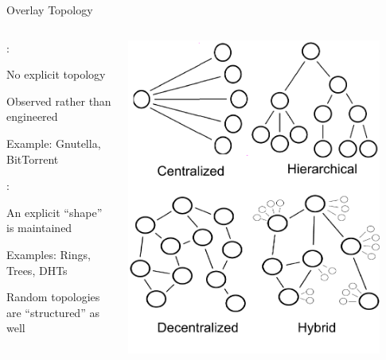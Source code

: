 
\begin{frame}{Overlay Topology}

\begin{columns}
\begin{column}{0.4\textwidth}
:
	\BI
	\item No explicit topology
	\item Observed rather than engineered
	\item Example: Gnutella, BitTorrent
	\EI
	
\bigskip
{}:
\BI
\item An explicit “shape” is maintained
\item Examples: Rings, Trees, DHTs
\item Random topologies are “structured” as well
\EI
\end{column}
\begin{column}{0.6\textwidth}
	\includegraphics[width=0.9\textwidth]{p2ptypes}
\end{column}
\end{columns}

\end{frame}


